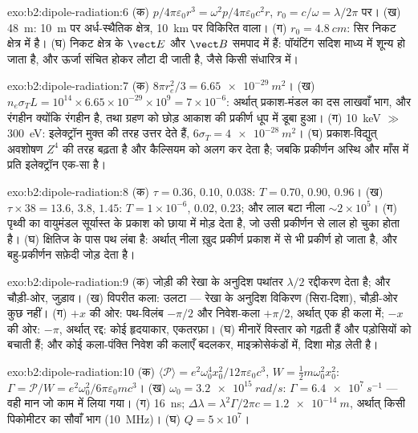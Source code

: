 \begin{solution}{exo:b2:dipole-radiation:6}
(क) $p/4\pi\varepsilon_0r^3 = \omega^2p/4\pi\varepsilon_0c^2r$, $r_0 = c/\omega = \lambda/2\pi$ पर। (ख) \qty{48}{m}:
\qty{10}{m} पर अर्ध-स्थैतिक क्षेत्र, \qty{10}{km} पर विकिरित वाला। (ग)
$r_0 = \qty{4.8}{cm}$: सिर निकट क्षेत्र में है। (घ) निकट क्षेत्र के $\vect E$
और $\vect B$ समपाद में हैं: पॉयंटिंग सदिश माध्य में शून्य हो जाता है,
और ऊर्जा संचित होकर लौटा दी जाती है, जैसे किसी संधारित्र में।
\end{solution}

\begin{solution}{exo:b2:dipole-radiation:7}
(क) $8\pi r_e^2/3 = \qty{6.65e-29}{m^2}$। (ख) $n_e\sigma_TL = 10^{14} \times 6.65 \times 10^{-29}
\times 10^9 = 7 \times 10^{-6}$: अर्थात् प्रकाश-मंडल का दस लाखवाँ भाग, और रंगहीन क्योंकि
 रंगहीन है, तथा ग्रहण को छोड़ आकाश की प्रकीर्ण धूप में
डूबा हुआ। (ग) \qty{10}{keV} $\gg$ \qty{300}{eV}: इलेक्ट्रॉन मुक्त की तरह
उत्तर देते हैं, $6\sigma_T = \qty{4e-28}{m^2}$। (घ) प्रकाश-विद्युत् अवशोषण $Z^4$ की तरह
बढ़ता है और कैल्सियम को अलग कर देता है; जबकि प्रकीर्णन अस्थि और माँस में
प्रति इलेक्ट्रॉन एक-सा है।
\end{solution}

\begin{solution}{exo:b2:dipole-radiation:8}
(क) $\tau = 0.36$, $0.10$, $0.038$: $T = 0.70$, $0.90$, $0.96$। (ख) $\tau \times 38 = 13.6$,
$3.8$, $1.45$: $T = 1 \times 10^{-6}$, $0.02$, $0.23$; और लाल बटा नीला $\sim 2 \times 10^5$। (ग)
पृथ्वी का वायुमंडल सूर्यास्त के प्रकाश को छाया में मोड़ देता है, जो उसी
प्रकीर्णन से लाल हो चुका होता है। (घ) क्षितिज के पास पथ लंबा है: अर्थात्
नीला ख़ुद प्रकीर्ण प्रकाश में से भी प्रकीर्ण हो जाता है, और बहु-प्रकीर्णन
सफ़ेदी जोड़ देता है।
\end{solution}

\begin{solution}{exo:b2:dipole-radiation:9}
(क) जोड़ी की रेखा के अनुदिश पथांतर $\lambda/2$ रद्दीकरण देता है;
और चौड़ी-ओर, जुड़ाव। (ख) विपरीत कला: उलटा ---
रेखा के अनुदिश विकिरण (सिरा-दिशा), चौड़ी-ओर कुछ नहीं। (ग) $+x$ की ओर:
पथ-विलंब $-\pi/2$ और निवेश-कला $+\pi/2$, अर्थात् एक ही कला में; $-x$ की ओर:
$-\pi$, अर्थात् रद्द: कोई हृदयाकार, एकतरफ़ा। (घ) मीनारें विस्तार को गढ़ती हैं
और पड़ोसियों को बचाती हैं; और कोई कला-पंक्ति निवेश की कलाएँ बदलकर,
माइक्रोसेकंडों में, दिशा मोड़ लेती है।
\end{solution}

\begin{solution}{exo:b2:dipole-radiation:10}
(क) $\langle\mathcal P\rangle = e^2\omega_0^4x_0^2/12\pi\varepsilon_0c^3$, $W = \tfrac12m\omega_0^2x_0^2$:
$\Gamma = \mathcal P/W = e^2\omega_0^2/6\pi\varepsilon_0mc^3$। (ख) $\omega_0 = \qty{3.2e15}{rad/s}$: $\Gamma =
\qty{6.4e7}{s^{-1}}$ --- वही मान जो काम में लिया गया। (ग) \qty{16}{ns}; $\Delta\lambda = \lambda^2\Gamma/2\pi c =
\qty{1.2e-14}{m}$, अर्थात् किसी पिकोमीटर का सौवाँ भाग (\qty{10}{MHz})। (घ) $Q = 5 \times 10^7$।
\end{solution}

